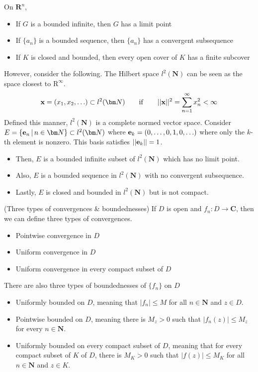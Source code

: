 \begin{rmk}
On ${\bm R}^{n}$,
\begin{itemize}
\item[(i)] If $G$ is a bounded infinite, then $G$ has a limit point
\item[(ii)] If $\{a_{n}\}$ is a bounded sequence, then $\{a_{n}\}$ has a convergent subsequence
\item[(iii)] If $K$ is closed and bounded, then every open cover of $K$ has a finite subcover
\end{itemize}
However, consider the following. The Hilbert space $l^2({\bm N})$ can be seen as the space closest to $\mathrm{R}^{\infty }$. 
\[{\bf x}=(x_1,x_2,\ldots )\subset l^2({\bm N})\qquad\mathrm{if}\qquad ||{\bf x}||^2=\sum ^{\infty }_{n=1}x_{n}^2 < \infty \]
Defined this manner, $l^2({\bm N})$ is a complete normed vector space. Consider $E=\{{\bf e}_{n}\,|\,n\in {\bm N}\}\subset l^2({\bm N})$ where ${\bf e}_{k}=(0,\ldots ,0,1,0,\ldots )$ where only the $k$-th element is nonzero. This basis satisfies $||{\bf e}_{k}||=1$. 
\begin{itemize}
\item[(i)] Then, $E$ is a bounded infinite subset of $l^2({\bm N})$ which has no limit point.
\item[(ii)] Also, $E$ is a bounded sequence in $l^2({\bm N})$ with no convergent subsequence.
\item[(iii)]  Lastly, $E$ is closed and bounded in $l^2({\bm N})$ but is not compact. 
\end{itemize}
\end{rmk}
\vspace{2ex}
\begin{defi}
(Three types of convergences \& boundednesses) If $D$ is open and $f_{n}:D\rightarrow {\bm C}$, then we can define three types of convergences.
\begin{itemize}
\item[(i)] Pointwise convergence in $D$
\item[(ii)] Uniform convergence in $D$
\item[(iii)] Uniform convergence in every compact subset of $D$
\end{itemize}
There are also three types of boundednesses of $\{f_{n}\}$ on $D$ 
\begin{itemize}
\item[(i)] Uniformly bounded on $D$, meaning that $|f_{n}|\leq M$ for all $n\in {\bm N}$ and $z\in D$.
\item[(ii)] Pointwise bounded on $D$, meaning there is $M_{z}>0$ such that $|f_{n}(z)|\leq M_{z}$ for every $n\in {\bm N}$.
\item[(iii)] Uniformly bounded on every compact subset of $D$, meaning that for every compact subset of $K$ of $D$, there is $M_{K}>0$ such that $|f(z)|\leq M_{K}$ for all $n\in {\bm N}$ and $z\in K$.
\end{itemize}
\end{defi}
